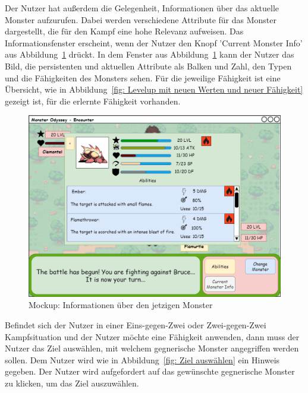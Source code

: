 Der Nutzer hat außerdem die Gelegenheit, Informationen über das aktuelle Monster aufzurufen. Dabei werden verschiedene Attribute für das Monster dargestellt, die für den Kampf eine hohe Relevanz aufweisen. Das Informationsfenster erscheint, wenn der Nutzer den Knopf 'Current Monster Info' aus Abbildung~\ref{fig: Informationen über den jetzigen Monster} drückt. In dem Fenster aus Abbildung~\ref{fig: Informationen über den jetzigen Monster} kann der Nutzer das Bild, die persistenten und aktuellen Attribute als Balken und Zahl, den Typen und die Fähigkeiten des Monsters sehen. Für die jeweilige Fähigkeit ist eine Übersicht, wie in Abbildung~\ref{fig: Levelup mit neuen Werten und neuer Fähigkeit} gezeigt ist, für die erlernte Fähigkeit vorhanden.  
\begin{figure}[H]
    \center
    \includegraphics[scale=\scale]{images/mockups/Encounter/Encounter1v1Info.png}
    \caption{Mockup: Informationen über den jetzigen Monster}
    \label{fig: Informationen über den jetzigen Monster}
\end{figure}
Befindet sich der Nutzer in einer Eins-gegen-Zwei oder Zwei-gegen-Zwei Kampfsituation und der Nutzer möchte eine Fähigkeit anwenden, dann muss der Nutzer das Ziel auswählen, mit welchem gegnerische Monster angegriffen werden sollen. 
Dem Nutzer wird wie in Abbildung~\ref{fig: Ziel auswählen} ein Hinweis gegeben. Der Nutzer wird aufgefordert auf das gewünschte gegnerische Monster zu klicken, um das Ziel auszuwählen. 
